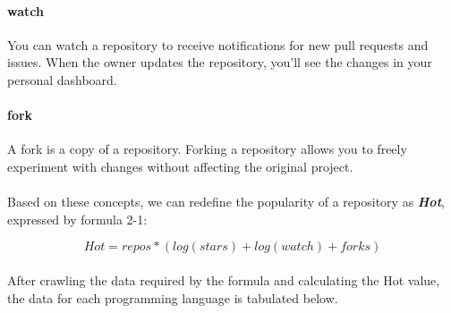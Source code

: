 \documentclass[11pt,onside,a4paper,fleqn]{report}
\begin{document}
\paragraph{watch} You can watch a repository to receive notifications for new pull requests and issues. When the owner 
updates the repository, you'll see the changes in your personal dashboard.

\paragraph{fork} A fork is a copy of a repository. Forking a repository allows you to freely experiment with changes 
without affecting the original project.

\paragraph{} Based on these concepts, we can redefine the popularity of a repository as \textbf{\emph{Hot}}, expressed by formula 2-1:

 $$Hot = repos * (log(stars) + log(watch) + forks)$$

\paragraph{} After crawling the data required by the formula and calculating the Hot value, the data for each programming language is tabulated below.
\end{document}
